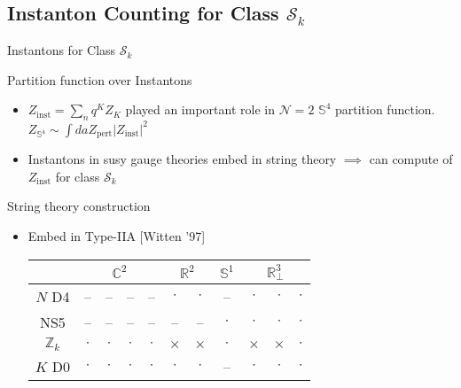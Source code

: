 \documentclass{beamer}
\begin{document}
\subsection{Instanton Counting for Class $\mathcal{S}_k$}
\begin{frame}{Instantons for Class $\mathcal{S}_k$}
\begin{block}{Partition function over Instantons}
\begin{itemize}
  \itemsep1em
    \item{$Z_{\text{inst}}=\sum_nq^KZ_K$ played an important role in $\mathcal{N}=2$ $\mathbb{S}^4$ partition function. $Z_{\mathbb{S}^4}\sim\int daZ_{\text{pert}}|Z_{\text{inst}}|^2$}
    \item{Instantons in susy gauge theories embed in string theory $\implies$ can compute of $Z_{\text{inst}}$ for class $\mathcal{S}_k$}
\end{itemize}
\end{block}
\begin{block}{String theory construction}
\begin{itemize}
\itemsep1em
\item{Embed in Type-IIA \color{blue}[Witten '97]\color{black}
    \begin{center}
        \begin{tabular}{|c|c|c|c|c|c|c|c|c|c|c|}
               \multicolumn{1}{c|}{} &\multicolumn{4}{c|}{$\mathbb{C}^2$}&\multicolumn{2}{c|}{$\mathbb{R}^2$}&\multicolumn{1}{c|}{$\mathbb{S}^1$}&\multicolumn{3}{c|}{$\mathbb{R}^3_{\perp}$}\\\hline
             $N$ D4 & --&--&--&--&$\cdot$&$\cdot$&--&$\cdot$&$\cdot$&$\cdot$ \\\hline
             NS5 &--&--&--&--&--&--&$\cdot$&$\cdot$&$\cdot$&$\cdot$ \\\hline
             $\mathbb{Z}_k$ &$\cdot$&$\cdot$&$\cdot$&$\cdot$&$\times$&$\times$&$\cdot$&$\times$&$\times$&$\cdot$ \\\hline
              $K$ D0 &$\cdot$&$\cdot$&$\cdot$&$\cdot$&$\cdot$&$\cdot$&--&$\cdot$&$\cdot$&$\cdot$ \\\hline
        \end{tabular}
    \end{center}}

    \end{itemize}
    \end{block}
\end{frame}
\end{document}
